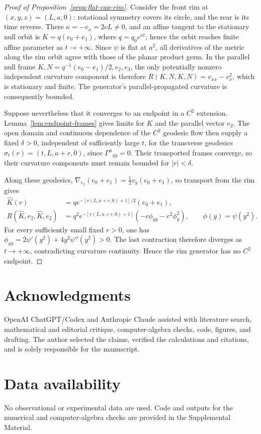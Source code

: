 \documentclass[10pt]{article}
\begin{document}
\begin{proof}[Proof of Proposition~\ref{prop:flat-cap-rim}]
Consider the front rim at \((x,y,z)=(L,a,0)\); rotational symmetry covers its
circle, and the rear is its time reverse.
There \(\kappa=-v_x=2cL\ne0\), and an affine tangent to the stationary null
orbit is \(K=q(e_0+e_1)\), where \(q=q_0e^{\kappa t}\); hence the orbit reaches
finite affine parameter as \(t\to+\infty\).  Since \(\psi\) is flat at
\(a^2\), all derivatives of the metric along the rim orbit agree with those of
the planar product germ.  In the parallel null frame
\(K,N=q^{-1}(e_0-e_1)/2,e_2,e_3\), the only potentially nonzero independent
curvature component is therefore
\(R(K,N,K,N)=v_{xx}-v_x^2\), which is stationary and finite.  The generator's
parallel-propagated curvature is consequently bounded.

Suppose nevertheless that it converges to an endpoint in a \(C^2\) extension.
Lemma~\ref{lem:endpoint-frames} gives limits for \(K\) and the parallel vector
\(e_2\).  The open domain and continuous dependence of the \(C^2\) geodesic
flow \cite[Sec.~2.3]{Minguzzi2019} then supply a fixed \(\delta>0\), independent
of sufficiently large \(t\), for the transverse geodesics
\(\sigma_t(r)=(t,L,a+r,0)\), since \(\Gamma^\mu{}_{yy}=0\).  Their transported
frames converge, so their curvature components must remain bounded for
\(|r|<\delta\).

Along these geodesics,
\(\nabla_{e_2}(e_0+e_1)=\tfrac12v_y(e_0+e_1)\), so transport from the rim gives
\begin{align*}
 \widehat K(r)&=q e^{-[v(L,a+r,0)+1]/2}(e_0+e_1),\\
 R(\widehat K,e_2,\widehat K,e_2)
 &=q^2e^{-[v(L,a+r,0)+1]}(-c\phi_{yy}-c^2\phi_y^2),
 \qquad \phi(y)=\psi(y^2).
\end{align*}
For every sufficiently small fixed \(r>0\), one has
\(\phi_{yy}=2\psi'(y^2)+4y^2\psi''(y^2)>0\).  The last contraction therefore
diverges as \(t\to+\infty\), contradicting curvature continuity.  Hence the
rim generator has no \(C^2\) endpoint.
\end{proof}

\section*{Acknowledgments}

OpenAI ChatGPT/Codex and Anthropic Claude assisted with literature search,
mathematical and editorial critique, computer-algebra checks, code, figures,
and drafting.  The author selected the claims, verified the calculations and
citations, and is solely responsible for the manuscript.

\section*{Data availability}

No observational or experimental data are used.  Code and outputs for the
numerical and computer-algebra checks are provided in the Supplemental
Material.

{\small\raggedright


}
\end{document}
